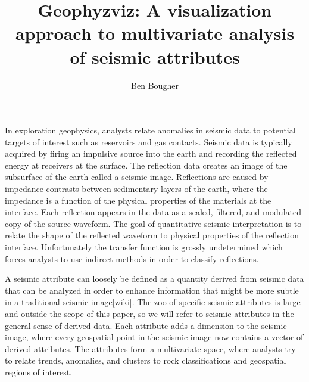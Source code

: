 \documentclass[journal]{vgtc}                %
\title{Geophyzviz: A visualization approach to multivariate analysis of seismic attributes}
\author{Ben Bougher}
\begin{document}


\maketitle


In exploration geophysics, analysts relate anomalies in seismic data to
potential targets of interest such as reservoirs and gas contacts.
Seismic data is typically acquired by firing an impulsive source into the earth and
recording the reflected energy at receivers at the surface. The reflection data creates an image
of the subsurface of the earth called a seismic image. Reflections are caused by
impedance contrasts between sedimentary layers of the earth, where the impedance is a function
of the physical properties of the materials at the interface. Each reflection appears in the data as
a scaled, filtered, and modulated copy of the source waveform. The goal of quantitative
seismic interpretation is to relate the shape of the reflected waveform to physical
properties of the reflection interface. Unfortunately the transfer function is grossly
undetermined which forces analysts to use indirect methods in order to classify reflections.

A seismic attribute can loosely be defined as a quantity derived from seismic data
that can be analyzed in order to enhance information that might be more subtle
in a traditional seismic image[wiki]. The zoo of specific seismic attributes is large and
outside the scope of this paper, so we will refer to seismic attributes in the general sense
of derived data. Each attribute adds a dimension to the seismic image, where every geospatial
point in the seismic image now contains a vector of derived attributes. The attributes form
a multivariate space, where analysts try to relate trends, anomalies, and clusters to
rock classifications and geospatial regions of interest.
\end{document}
